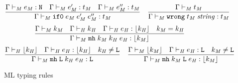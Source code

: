 \begin{figure}[p]
\[
\frac
{\judem{\env}{\first{\varexpm}}{\tynum} \quad \judem{\env}{\second{\varexpm}}{\vartym} \quad \judem{\env}{\third{\varexpm}}{\vartym}}
{\judem{\env}{\expif{\first{\varexpm}}{\second{\varexpm}}{\third{\varexpm}}}{\vartym}}
\quad
\frac
{\judtm{\env}{\vartym}}
{\judem{\env}{\expwrongs{\vartym}{\formvar{string}}}{\vartym}}
\]
\[
\frac
{\judtm{\env}{\varcsm} \quad \judth{\env}{\varcsh} \quad \judeh{\env}{\varexph}{\tyunbrand{\varcsh}} \quad \varcsm = \varcsh}
{\judem{\env}{\expmh{\varcsm}{\varcsh}{\varexph}}{\tyunbrand{\varcsm}}}
\]
\[
\frac
{\judth{\env}{\tyunbrand{\varcsh}} \quad \judeh{\env}{\varexph}{\tyunbrand{\varcsh}} \quad \varcsh \neq \cslump}
{\judem{\env}{\expmh{\cslump}{\varcsh}{\varexph}}{\tylump}}
\quad
\frac
{\judtm{\env}{\tyunbrand{\varcsm}} \quad \judeh{\env}{\varexph}{\tylump} \quad \varcsm \neq \cslump}
{\judem{\env}{\expmh{\varcsm}{\cslump}{\varexph}}{\tyunbrand{\varcsm}}}
\]
\caption{ML typing rules}
\label{mtr}
\end{figure}